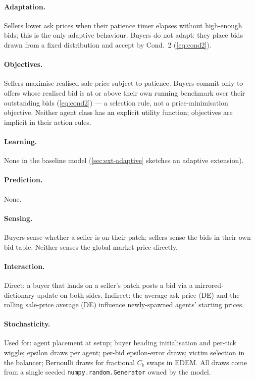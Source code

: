 \paragraph{Adaptation.} Sellers lower ask prices when their patience
timer elapses without high-enough bids; this is the only adaptive
behaviour. Buyers do not adapt: they place bids drawn from a fixed
distribution and accept by Cond.~2 (\cref{eq:cond2}).

\paragraph{Objectives.} Sellers maximise realised sale price subject
to patience. Buyers commit only to offers whose realised bid is at or
above their own running benchmark over their outstanding bids
(\cref{eq:cond2}) --- a selection rule, not a price-minimisation
objective. Neither agent class has an explicit utility function;
objectives are implicit in their action rules.

\paragraph{Learning.} None in the baseline model
(\cref{sec:ext-adaptive} sketches an adaptive extension).

\paragraph{Prediction.} None.

\paragraph{Sensing.} Buyers sense whether a seller is on their patch;
sellers sense the bids in their own bid table. Neither senses the
global market price directly.

\paragraph{Interaction.} Direct: a buyer that lands on a seller's
patch posts a bid via a mirrored-dictionary update on both sides.
Indirect: the average ask price (DE) and the rolling sale-price
average (DE) influence newly-spawned agents' starting prices.

\paragraph{Stochasticity.} Used for: agent placement at setup;
buyer heading initialisation and per-tick wiggle; epsilon draws
per agent; per-bid epsilon-error draws; victim selection in the
balancer; Bernoulli draws for fractional $C_{b}$ swaps in EDEM.
All draws come from a single seeded \texttt{numpy.random.Generator}
owned by the model.

